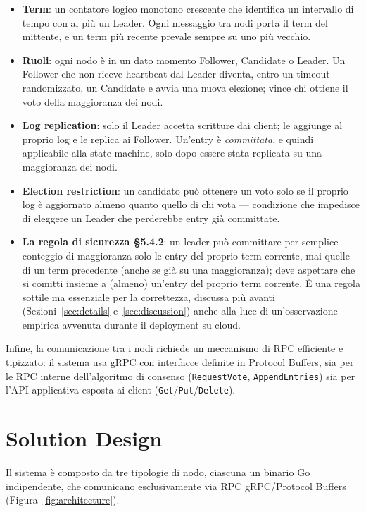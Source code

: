 \documentclass[conference]{IEEEtran}
\begin{document}
\begin{itemize}
  \item \textbf{Term}: un contatore logico monotono crescente che
  identifica un intervallo di tempo con al più un Leader. Ogni messaggio
  tra nodi porta il term del mittente, e un term più recente prevale
  sempre su uno più vecchio.
  \item \textbf{Ruoli}: ogni nodo è in un dato momento Follower,
  Candidate o Leader. Un Follower che non riceve heartbeat dal Leader
  diventa, entro un timeout randomizzato, un Candidate e avvia una nuova
  elezione; vince chi ottiene il voto della maggioranza dei nodi.
  \item \textbf{Log replication}: solo il Leader accetta scritture dai
  client; le aggiunge al proprio log e le replica ai Follower. Un'entry è
  \emph{committata}, e quindi applicabile alla state machine, solo dopo
  essere stata replicata su una maggioranza dei nodi.
  \item \textbf{Election restriction}: un candidato può ottenere un voto
  solo se il proprio log è aggiornato almeno quanto quello di chi vota —
  condizione che impedisce di eleggere un Leader che perderebbe entry già
  committate.
  \item \textbf{La regola di sicurezza \S5.4.2}: un leader può committare per semplice conteggio di maggioranza solo le entry del proprio term corrente, mai quelle di un term precedente (anche se già su una maggioranza); deve aspettare che si comitti insieme a (almeno) un'entry del proprio term corrente. È una regola sottile ma essenziale per la correttezza, discussa più avanti (Sezioni~\ref{sec:details} e~\ref{sec:discussion}) anche alla luce di un'osservazione empirica avvenuta durante il deployment su cloud.
\end{itemize}

Infine, la comunicazione tra i nodi richiede un meccanismo di RPC
efficiente e tipizzato: il sistema usa gRPC con interfacce definite in
Protocol Buffers, sia per le RPC interne dell'algoritmo di consenso
(\texttt{RequestVote}, \texttt{AppendEntries}) sia per l'API applicativa
esposta ai client (\texttt{Get}/\texttt{Put}/\texttt{Delete}).

\section{Solution Design}
\label{sec:design}

Il sistema è composto da tre tipologie di nodo, ciascuna un binario Go
indipendente, che comunicano esclusivamente via RPC gRPC/Protocol Buffers
(Figura~\ref{fig:architecture}).
\end{document}
